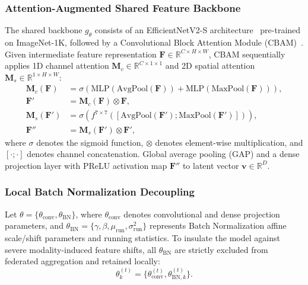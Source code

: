 \documentclass[journal]{IEEEtran}
\begin{document}
\subsubsection{Attention-Augmented Shared Feature Backbone}
The shared backbone $g_\theta$ consists of an EfficientNetV2-S architecture~\cite{tan2021efficientnetv2} pre-trained on ImageNet-1K, followed by a Convolutional Block Attention Module (CBAM)~\cite{woo2018cbam}. Given intermediate feature representation $\mathbf{F} \in \mathbb{R}^{C \times H \times W}$, CBAM sequentially applies 1D channel attention $\mathbf{M}_c \in \mathbb{R}^{C \times 1 \times 1}$ and 2D spatial attention $\mathbf{M}_s \in \mathbb{R}^{1 \times H \times W}$:
\begin{align}
\mathbf{M}_c(\mathbf{F}) &= \sigma\left( \text{MLP}(\text{AvgPool}(\mathbf{F})) + \text{MLP}(\text{MaxPool}(\mathbf{F})) \right), \\
\mathbf{F}' &= \mathbf{M}_c(\mathbf{F}) \otimes \mathbf{F}, \\
\mathbf{M}_s(\mathbf{F}') &= \sigma\left( f^{7\times 7}\left( [\text{AvgPool}(\mathbf{F}'); \text{MaxPool}(\mathbf{F}')] \right) \right), \\
\mathbf{F}'' &= \mathbf{M}_s(\mathbf{F}') \otimes \mathbf{F}',
\end{align}
where $\sigma$ denotes the sigmoid function, $\otimes$ denotes element-wise multiplication, and $[\cdot ; \cdot]$ denotes channel concatenation. Global average pooling (GAP) and a dense projection layer with PReLU activation map $\mathbf{F}''$ to latent vector $\mathbf{v} \in \mathbb{R}^D$.

\subsubsection{Local Batch Normalization Decoupling}
Let $\theta = \{ \theta_{\text{conv}}, \theta_{\text{BN}} \}$, where $\theta_{\text{conv}}$ denotes convolutional and dense projection parameters, and $\theta_{\text{BN}} = \{ \gamma, \beta, \mu_{\text{run}}, \sigma^2_{\text{run}} \}$ represents Batch Normalization affine scale/shift parameters and running statistics. To insulate the model against severe modality-induced feature shifts, all $\theta_{\text{BN}}$ are strictly excluded from federated aggregation and retained locally:
\begin{equation}
\theta_k^{(t)} = \{ \theta_{\text{conv}}^{(t)}, \theta_{\text{BN}, k}^{(t)} \}.
\end{equation}
\end{document}
